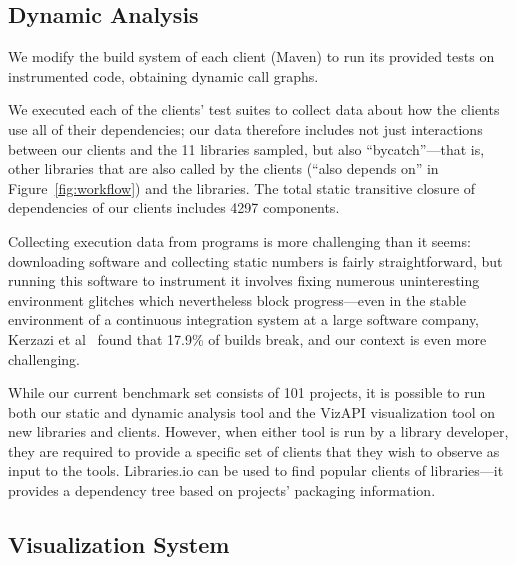 \subsection{Dynamic Analysis}
We modify the build system of each
client (Maven) to run its provided tests on instrumented
code, obtaining dynamic call graphs.


We executed each of the clients' test suites to collect data about how the clients use all of their dependencies; our data therefore includes not just interactions between our clients and the 11 libraries sampled, but also ``bycatch''---that is, other libraries that are also called by the clients (``also depends on'' in Figure~\ref{fig:workflow}) and the libraries. The total static transitive closure of dependencies of our clients includes 4297 components.

Collecting execution data from programs is more challenging than it seems: downloading software and collecting static numbers is fairly straightforward, but running this software to instrument it involves fixing numerous uninteresting environment glitches which nevertheless block progress---even in the stable environment of a continuous integration system at a large software company, Kerzazi et al~\cite{kerzazi14:_why_do_autom_build_break} found that 17.9\% of builds break, and our context is even more challenging.

While our current benchmark set consists of 101 projects, it is possible to run both our static and dynamic analysis tool and the VizAPI visualization tool on new libraries and clients. However, when either tool is run by a library developer, they are required to provide a specific set of clients that they wish to observe as input to the tools. Libraries.io can be used to find popular clients of libraries---it provides a dependency tree based on projects' packaging information.


\subsection{Visualization System}
\label{subsec:vis-system}

